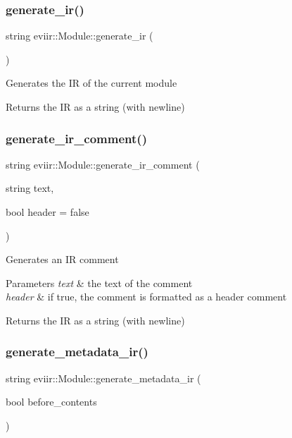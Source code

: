 \subsubsection{\texorpdfstring{generate\+\_\+ir()}{generate\_ir()}}
{\footnotesize\ttfamily string eviir\+::\+Module\+::generate\+\_\+ir (\begin{DoxyParamCaption}{ }\end{DoxyParamCaption})}

Generates the IR of the current module \begin{DoxyReturn}{Returns}
the IR as a string (with newline) 
\end{DoxyReturn}
\mbox{\label{classeviir_1_1Module_af0b137a091f26e141482a37904ea069e}} 
\subsubsection{\texorpdfstring{generate\+\_\+ir\+\_\+comment()}{generate\_ir\_comment()}}
{\footnotesize\ttfamily string eviir\+::\+Module\+::generate\+\_\+ir\+\_\+comment (\begin{DoxyParamCaption}\item[{string}]{text,  }\item[{bool}]{header = {\ttfamily false} }\end{DoxyParamCaption})}

Generates an IR comment 
\begin{DoxyParams}{Parameters}
{\em text} & the text of the comment \\
\hline
{\em header} & if true, the comment is formatted as a header comment \\
\hline
\end{DoxyParams}
\begin{DoxyReturn}{Returns}
the IR as a string (with newline) 
\end{DoxyReturn}
\mbox{\label{classeviir_1_1Module_a386b1c517ca759e7858ccf09a2411994}} 
\subsubsection{\texorpdfstring{generate\+\_\+metadata\+\_\+ir()}{generate\_metadata\_ir()}}
{\footnotesize\ttfamily string eviir\+::\+Module\+::generate\+\_\+metadata\+\_\+ir (\begin{DoxyParamCaption}\item[{bool}]{before\+\_\+contents }\end{DoxyParamCaption})}


